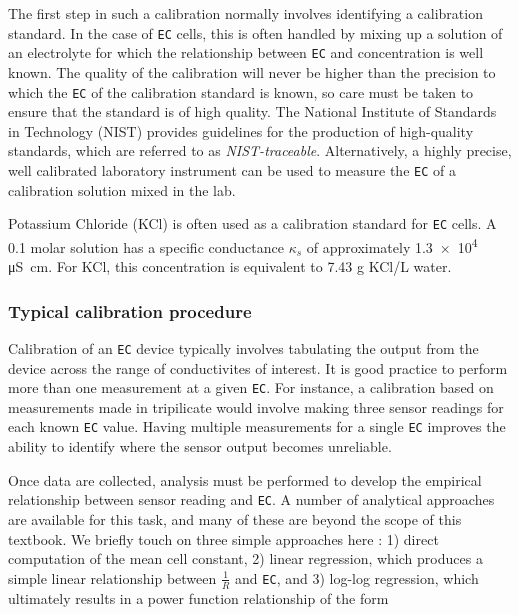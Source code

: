 The first step in such a calibration normally involves identifying a calibration standard. In the case of \texttt{EC} cells, this is often handled by mixing up a solution of an electrolyte for which the relationship between \texttt{EC} and concentration is well known. The quality of the calibration will never be higher than the precision to which the \texttt{EC} of the calibration standard is known, so care must be taken to ensure that the standard is of high quality. The National Institute of Standards in Technology (NIST) provides guidelines for the production of high-quality standards, which are referred to as \emph{NIST-traceable}.  Alternatively, a highly precise, well calibrated laboratory instrument can be used to measure the \texttt{EC} of a calibration solution mixed in the lab.  

\begin{kaobox}[frametitle=Mixing up an \texttt{EC} calibration fluid]
Potassium Chloride (KCl) is often used as a calibration standard for \texttt{EC} cells. A 0.1 molar solution has a specific conductance $\kappa_s$ of approximately \num{1.3e4} \si{\micro\siemens\cm}. For KCl, this concentration is equivalent to 7.43 g KCl/L water.
\end{kaobox}

\subsubsection{Typical calibration procedure}
Calibration of an \texttt{EC} device typically involves tabulating the output from the device across the range of conductivites of interest. It is good practice to perform more than one measurement at a given \texttt{EC}. For instance, a calibration based on measurements made in tripilicate would involve making three sensor readings for each known \texttt{EC} value. Having multiple measurements for a single \texttt{EC} improves the ability to identify where the sensor output becomes unreliable.

Once data are collected, analysis must be performed to develop the empirical relationship between sensor reading and \texttt{EC}. A number of analytical approaches are available for this task, and many of these are beyond the scope of this textbook. We briefly touch on three simple approaches here
: 1) direct computation of the mean cell constant, 2) linear regression, which produces a simple linear relationship between $\frac{1}{R}$ and \texttt{EC}, and 3) log-log regression, which ultimately results in a power function relationship of the form 

